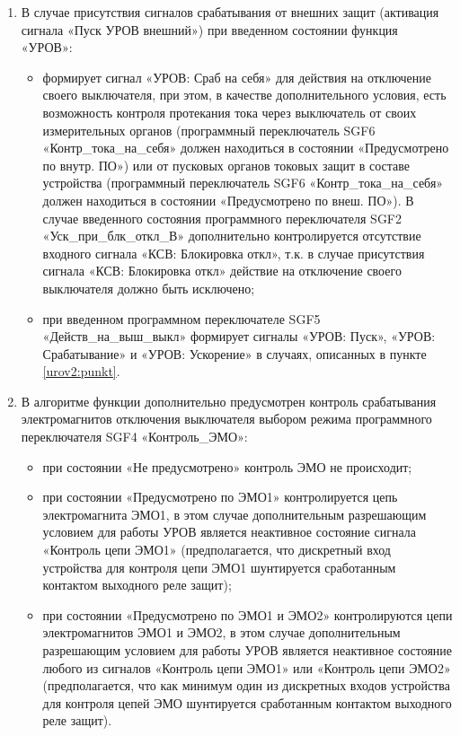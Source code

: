 \begin{enumerate}
\begin{itemize}
\item формирует сигнал «УРОВ: Срабатывание» через выдержку таймера Т1 (уставка «Тср») при выведенном программном переключателе SGF2 «Уск\_при\_блк\_откл\_В» или введенном программном переключателе SGF2 «Уск\_при\_блк\_откл\_В» и отсутствии сигнала «КСВ: Блокировка откл» на входе функции;
\item формирует сигналы «УРОВ: Срабатывание» и «УРОВ: Ускорение» без выдержки времени при введенном программном переключателе SGF2 «Уск\_при\_блк\_откл\_В» и активном состоянии сигнала «КСВ: Блокировка откл».
\end{itemize}
\item
В случае присутствия сигналов срабатывания от внешних защит (активация сигнала «Пуск УРОВ внешний») при введенном состоянии функция «УРОВ»: 
\begin{itemize}
	\item формирует сигнал «УРОВ: Сраб на себя» для действия на отключение своего выключателя, при этом, в качестве дополнительного условия, есть возможность контроля протекания тока через выключатель от своих измерительных органов (программный переключатель SGF6 «Контр\_тока\_на\_себя» должен находиться в состоянии «Предусмотрено по внутр. ПО») или от пусковых органов токовых защит в составе устройства (программный переключатель SGF6 «Контр\_тока\_на\_себя» должен находиться в состоянии «Предусмотрено по внеш. ПО»). В случае введенного состояния программного переключателя SGF2 «Уск\_при\_блк\_откл\_В» дополнительно контролируется отсутствие входного сигнала «КСВ: Блокировка откл», т.к. в случае присутствия сигнала «КСВ: Блокировка откл» действие на отключение своего выключателя должно быть исключено;
	\item при введенном программном переключателе SGF5 «Действ\_на\_выш\_выкл» формирует сигналы «УРОВ: Пуск», «УРОВ: Срабатывание» и «УРОВ: Ускорение» в случаях, описанных в пункте \ref{urov2:punkt}.
\end{itemize}
\item
В алгоритме функции дополнительно предусмотрен контроль срабатывания электромагнитов отключения выключателя выбором режима программного переключателя SGF4 «Контроль\_ЭМО»:
\begin{itemize}
	\item при состоянии «Не предусмотрено» контроль ЭМО не происходит;
	\item при состоянии «Предусмотрено по ЭМО1» контролируется цепь электромагнита ЭМО1, в этом случае дополнительным разрешающим условием для работы УРОВ является неактивное состояние сигнала «Контроль цепи ЭМО1» (предполагается, что дискретный вход устройства для контроля цепи ЭМО1 шунтируется сработанным контактом выходного реле защит);
	\item при состоянии «Предусмотрено по ЭМО1 и ЭМО2» контролируются цепи электромагнитов ЭМО1 и ЭМО2, в этом случае дополнительным разрешающим условием для работы УРОВ является неактивное состояние любого из сигналов «Контроль цепи ЭМО1» или «Контроль цепи ЭМО2» (предполагается, что как минимум один из дискретных входов устройства для контроля цепей ЭМО шунтируется сработанным контактом выходного реле защит).
\end{itemize}


\end{enumerate}
